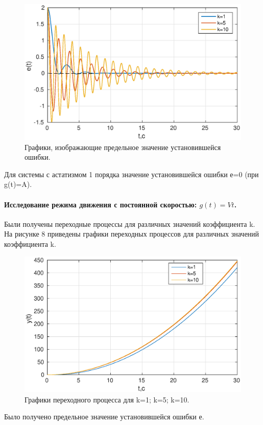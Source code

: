 \documentclass[a4paper,14pt]{article}
\begin{document}
\begin{figure}[H]
\centering
\includegraphics[width=\textwidth]{1/2_1e(t).eps}
\caption{Графики, изображающие предельное значение установившейся ошибки.}
\end{figure}

Для системы с астатизмом 1 порядка значение установившейся ошибки е=0 (при g(t)=A).

\paragraph{Исследование режима движения с постоянной скоростью: $g(t)=Vt$.}
Были получены переходные процессы для различных значений коэффициента  k.
На рисунке 8 приведены графики переходных процессов  для различных значений коэффициента  k.

\begin{figure}[H]
\centering
\includegraphics[width=\textwidth]{1/2_2y(t).eps}
\caption{Графики переходного процесса для k=1; k=5; k=10.}
\end{figure}
Было получено предельное значение установившейся ошибки е.
\end{document}
